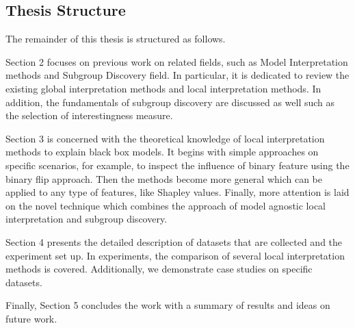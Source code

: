 \subsection{Thesis Structure}

The remainder of this thesis is structured as follows. 

Section 2 focuses on previous work on related fields, such as Model Interpretation methods and Subgroup Discovery field. In particular, it is dedicated to review the existing global interpretation methods and local interpretation methods. In addition, the fundamentals of subgroup discovery are discussed as well such as the selection of interestingness measure.

Section 3 is concerned with the theoretical knowledge of local interpretation methods to explain black box models. It begins with simple approaches on specific scenarios, for example, to inspect the influence of binary feature using the binary flip approach. Then the methods become more general which can be applied to any type of features, like Shapley values. Finally, more attention is laid on the novel technique which combines the approach of model agnostic local interpretation and subgroup discovery.

Section 4 presents the detailed description of datasets that are collected and the experiment set up. In experiments, the comparison of several local interpretation methods is covered. Additionally, we demonstrate case studies on specific datasets. 

Finally, Section 5 concludes the work with a summary of results and ideas on future work. 